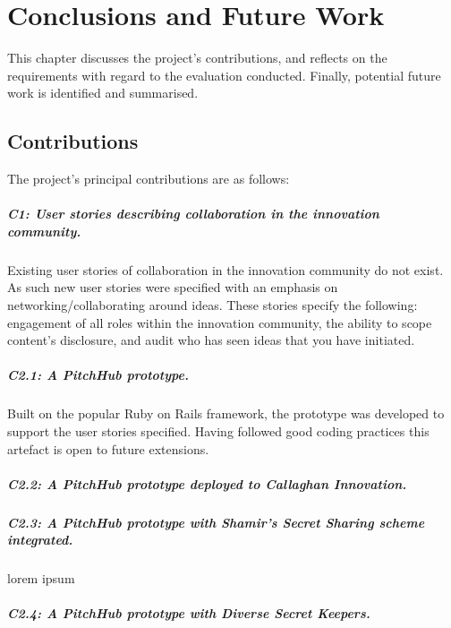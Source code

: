 \chapter{Conclusions and Future Work}
This chapter discusses the project's contributions, and reflects on the requirements with regard to the evaluation conducted. Finally, potential future work is identified and summarised.

\section{Contributions}
The project's principal contributions are as follows:

\paragraph{C1: User stories describing collaboration in the innovation community.} 

Existing user stories of collaboration in the innovation community do not exist. As such new user stories were specified with an emphasis on networking/collaborating around ideas. These stories specify the following: engagement of all roles within the innovation community, the ability to scope content's disclosure, and audit who has seen ideas that you have initiated.

\paragraph{C2.1: A PitchHub prototype.} 

Built on the popular Ruby on Rails framework, the prototype was developed to support the user stories specified. Having followed good coding practices this artefact is open to future extensions.

\paragraph{C2.2: A PitchHub prototype deployed to Callaghan Innovation.} 




\paragraph{C2.3: A PitchHub prototype with Shamir's Secret Sharing scheme integrated.} 

lorem ipsum

\paragraph{C2.4: A PitchHub prototype with Diverse Secret Keepers.} 

